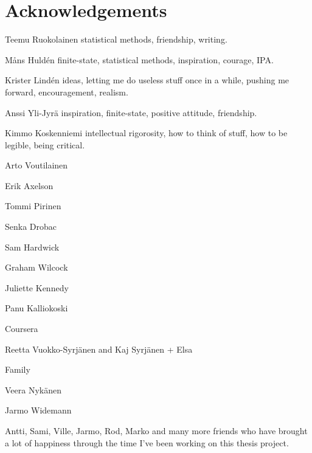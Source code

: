 \chapter*{Acknowledgements}
Teemu Ruokolainen statistical methods, friendship, writing.

Måns Huld\'{e}n finite-state, statistical methods, inspiration,
courage, IPA.

Krister Lind\'{e}n ideas, letting me do useless stuff once in a while,
pushing me forward, encouragement, realism.

Anssi Yli-Jyrä inspiration, finite-state, positive attitude, friendship.

Kimmo Koskenniemi intellectual rigorosity, how to think of stuff, how
to be legible, being critical.

Arto Voutilainen

Erik Axelson

Tommi Pirinen

Senka Drobac

Sam Hardwick

Graham Wilcock 

Juliette Kennedy

Panu Kalliokoski

Coursera

Reetta Vuokko-Syrjänen and Kaj Syrjänen + Elsa

Family

Veera Nykänen

Jarmo Widemann

Antti, Sami, Ville, Jarmo, Rod, Marko and many more friends who have
brought a lot of happiness through the time I've been working on this
thesis project.

